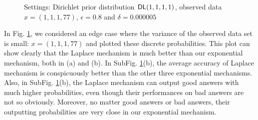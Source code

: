 \begin{figure}
\begin{center}
\centering
\caption{Settings: Dirichlet prior distribution $\mathsf{DL}(1,1,1,1)$, observed data $x = (1,1,1,77) $, $\epsilon = 0.8$ and $\delta = 0.000005$}
\label{fig_theory_1_1_1_77}
\end{center}
\end{figure}

In Fig. \ref{fig_theory_1_1_1_77}, we considered an edge case where the variance of the observed data set is small: $x=(1,1,1,77)$ and plotted these discrete probabilities. This plot can show clearly that the Laplace mechanism is much better than our exponential mechanism, both in (a) and (b). In SubFig. \ref{fig_theory_1_1_1_77}(b), the average accuracy of Laplace mechanism is conspicuously better than the other three exponential mechanisms. Also, in SubFig. \ref{fig_theory_1_1_1_77}(b), the Laplace mechanism can output good answers with much higher probabilities, even though their performances on bad answers are not so obviously. Moreover, no matter good answers or bad answers, their outputting probabilities are very close in our exponential mechanism. 

